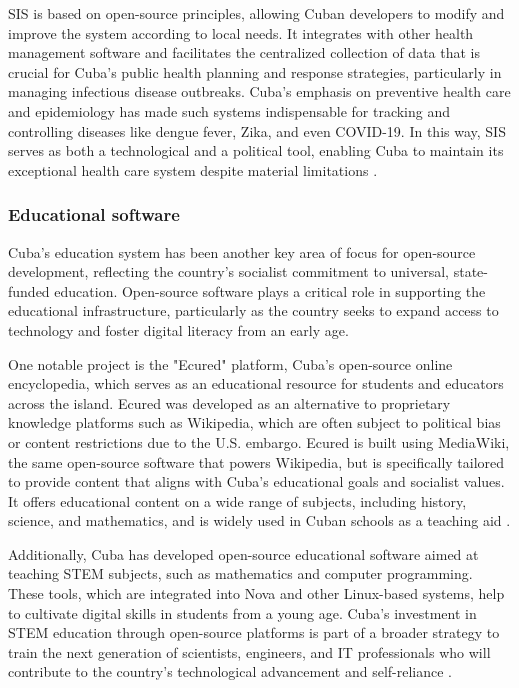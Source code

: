 \begin{refsection}
SIS is based on open-source principles, allowing Cuban developers to modify and improve the system according to local needs. It integrates with other health management software and facilitates the centralized collection of data that is crucial for Cuba’s public health planning and response strategies, particularly in managing infectious disease outbreaks. Cuba’s emphasis on preventive health care and epidemiology has made such systems indispensable for tracking and controlling diseases like dengue fever, Zika, and even COVID-19. In this way, SIS serves as both a technological and a political tool, enabling Cuba to maintain its exceptional health care system despite material limitations \cite[pp.~56-87]{kapcia}.

\subsubsection{Educational software}

Cuba’s education system has been another key area of focus for open-source development, reflecting the country's socialist commitment to universal, state-funded education. Open-source software plays a critical role in supporting the educational infrastructure, particularly as the country seeks to expand access to technology and foster digital literacy from an early age.

One notable project is the "Ecured" platform, Cuba’s open-source online encyclopedia, which serves as an educational resource for students and educators across the island. Ecured was developed as an alternative to proprietary knowledge platforms such as Wikipedia, which are often subject to political bias or content restrictions due to the U.S. embargo. Ecured is built using MediaWiki, the same open-source software that powers Wikipedia, but is specifically tailored to provide content that aligns with Cuba’s educational goals and socialist values. It offers educational content on a wide range of subjects, including history, science, and mathematics, and is widely used in Cuban schools as a teaching aid \cite[pp.~89-102]{kapcia}.

Additionally, Cuba has developed open-source educational software aimed at teaching STEM subjects, such as mathematics and computer programming. These tools, which are integrated into Nova and other Linux-based systems, help to cultivate digital skills in students from a young age. Cuba’s investment in STEM education through open-source platforms is part of a broader strategy to train the next generation of scientists, engineers, and IT professionals who will contribute to the country’s technological advancement and self-reliance \cite[pp.~45-67]{feinberg}.


\end{refsection}
